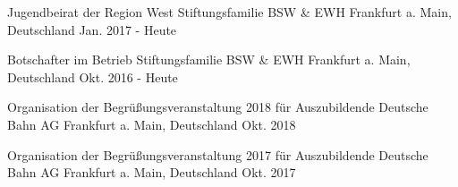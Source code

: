 

\begin{cventries}

  \cventry
    {Jugendbeirat der Region West} %
    {Stiftungsfamilie BSW \& EWH} %
    {Frankfurt a. Main, Deutschland} %
    {Jan. 2017 - Heute} %
    {
    }
    \vspace{-4.0mm}

  \cventry
    {Botschafter im Betrieb} %
    {Stiftungsfamilie BSW \& EWH} %
    {Frankfurt a. Main, Deutschland} %
    {Okt. 2016 - Heute} %
    {
    }
    \vspace{-4.0mm}

    
  \cventry
    {Organisation der Begrüßungsveranstaltung 2018 für Auszubildende} %
    {Deutsche Bahn AG} %
    {Frankfurt a. Main, Deutschland} %
    {Okt. 2018} %
    {
    }
    \vspace{-4.0mm}

    
  \cventry
    {Organisation der Begrüßungsveranstaltung 2017 für Auszubildende} %
    {Deutsche Bahn AG} %
    {Frankfurt a. Main, Deutschland} %
    {Okt. 2017} %
    {
    }
    \vspace{-4.0mm}
    

\end{cventries}

